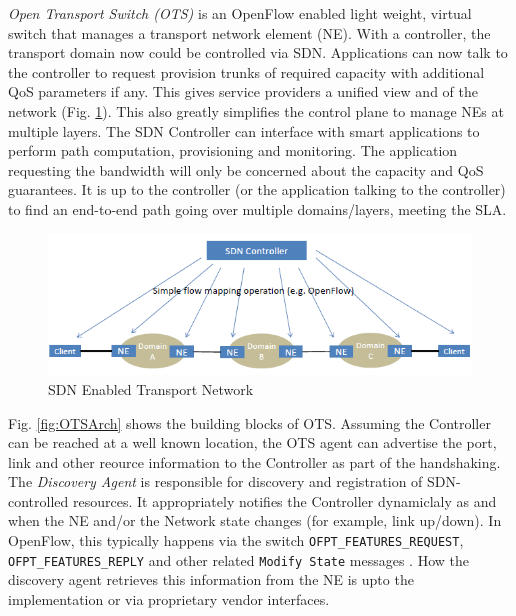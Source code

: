 \documentclass{sig-alternate-10pt}
\begin{document}
	\textit{Open Transport Switch (OTS)} is an OpenFlow \cite{OF1.0} enabled light weight, virtual switch
	that manages a transport network element (NE). With a controller, the transport domain now could be
	controlled via SDN. Applications can now talk to the controller to request provision trunks of required
	capacity with additional QoS parameters if any. This gives service providers a unified view and of the
	network (Fig. \ref{fig:MLwOF}). This also greatly simplifies the control plane to manage NEs at multiple
	layers. The SDN Controller can interface with smart applications to perform path computation,
	provisioning and monitoring. The application requesting the bandwidth will only be concerned about the
	capacity and QoS guarantees. It is up to the controller (or the application talking to the controller) to
	find an end-to-end path going over multiple domains/layers, meeting the SLA.

	\begin{figure}[htb]
	\centering
	\includegraphics[scale=0.50]{MLwOF.png}
	\caption{SDN Enabled Transport Network}
	\label{fig:MLwOF}
	\end{figure}

	Fig. \ref{fig:OTSArch} shows the building blocks of OTS. Assuming the Controller can be reached at a well
	known location, the OTS agent can advertise the port, link and other reource information to the
	Controller as part of the handshaking. The \textit{Discovery Agent} is responsible for discovery and
	registration of SDN-controlled resources. It appropriately notifies the Controller dynamiclaly as and
	when the NE and/or the Network state changes (for example, link up/down). In OpenFlow, this
	typically happens via the switch \texttt{OFPT\_FEATURES\_REQUEST}, \texttt{OFPT\_FEATURES\_REPLY} and
	other related \texttt{Modify State} messages \cite{OF1.0}. How the discovery agent retrieves this
	information from the NE is upto the implementation or via proprietary vendor interfaces. \\
	
\end{document}
